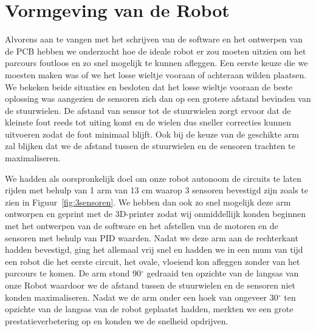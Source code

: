  
\chapter{Vormgeving van de Robot}
 




Alvorens aan te vangen met het schrijven van de software en het ontwerpen van de PCB hebben we onderzocht hoe de ideale robot er zou moeten uitzien om het parcours foutloos en zo snel mogelijk te kunnen afleggen. Een eerste keuze die we moesten maken was of we het losse wieltje vooraan of achteraan wilden plaatsen. We bekeken beide situaties en besloten dat het losse wieltje vooraan de beste oplossing was aangezien de sensoren zich dan op een grotere afstand bevinden van de stuurwielen. De afstand van sensor tot de stuurwielen zorgt ervoor dat de kleinste fout reeds tot uiting komt en de wielen dus sneller correcties kunnen uitvoeren zodat de fout minimaal blijft. Ook bij de keuze van de geschikte arm zal blijken dat we de afstand tussen de stuurwielen en de sensoren trachten te maximaliseren.


We hadden als oorspronkelijk doel om onze robot autonoom de circuits te laten rijden met behulp van 1 arm van 13 cm waarop 3 sensoren bevestigd zijn zoals te zien in Figuur~\ref{fig:3sensoren}. We hebben dan ook zo snel mogelijk deze arm ontworpen en geprint met de 3D-printer zodat wij onmiddellijk konden beginnen met het ontwerpen van de software en het afstellen van de motoren en de sensoren met behulp van PID waarden. Nadat we deze arm aan de rechterkant hadden bevestigd, ging het allemaal vrij snel en hadden we in een mum van tijd een robot die het eerste circuit, het ovale, vloeiend kon afleggen zonder van het parcours te komen. De arm stond 90$^\circ$ gedraaid ten opzichte van de langsas van onze Robot waardoor we de afstand tussen de stuurwielen en de sensoren niet konden maximaliseren. Nadat we de arm onder een hoek van ongeveer 30$^\circ$ ten opzichte van de langsas van de robot geplaatst hadden, merkten we een grote prestatieverbetering op en konden we de snelheid opdrijven.



